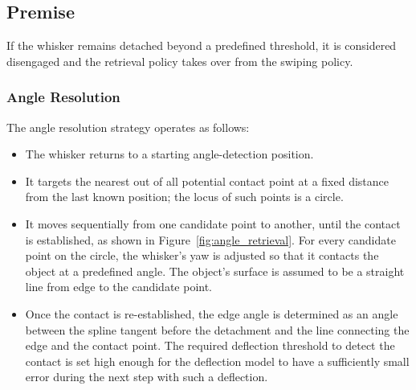 \subsection{Premise}
If the whisker remains detached beyond a predefined threshold, it is considered disengaged and the retrieval policy takes over from the swiping policy.

\subsubsection{Angle Resolution}
The angle resolution strategy operates as follows:
\begin{itemize}
    \item The whisker returns to a starting angle-detection position.
    \item It targets the nearest out of all potential contact point at a fixed distance from the last known position; the locus of such points is a circle.
    \item It moves sequentially from one candidate point to another, until the contact is established, as shown in Figure~\ref{fig:angle_retrieval}.
    For every candidate point on the circle, the whisker's yaw is adjusted so that it contacts the object at a predefined angle.
    The object's surface is assumed to be a straight line from edge to the candidate point.
    \item Once the contact is re-established, the edge angle is determined as an angle between the spline tangent before the detachment and the line connecting the edge and the contact point.
    The required deflection threshold to detect the contact is set high enough for the deflection model to have a sufficiently small error during the next step with such a deflection.
\end{itemize}

